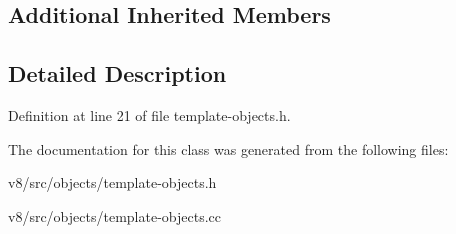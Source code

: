 \subsection*{Additional Inherited Members}


\subsection{Detailed Description}


Definition at line 21 of file template-\/objects.\+h.



The documentation for this class was generated from the following files\+:\begin{DoxyCompactItemize}
\item 
v8/src/objects/template-\/objects.\+h\item 
v8/src/objects/template-\/objects.\+cc\end{DoxyCompactItemize}
